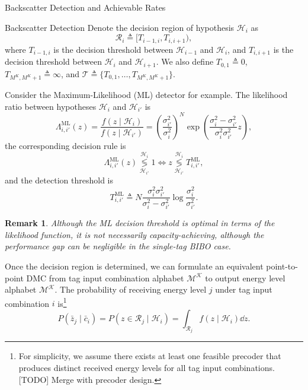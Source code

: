 \documentclass[journal]{IEEEtran}
\newtheorem{remark}{Remark}
\begin{document}
\begin{section}{Backscatter Detection and Achievable Rates}
\begin{subsection}{Backscatter Detection}
			Denote the decision region of hypothesis $\mathcal{H}_i$ as
			\begin{equation}
				\mathcal{R}_i \triangleq [T_{i-1,i}, T_{i,i+1}),
				\label{eq:decision_region}
			\end{equation}
			where $T_{i-1,i}$ is the decision threshold between $\mathcal{H}_{i-1}$ and $\mathcal{H}_i$, and $T_{i,i+1}$ is the decision threshold between $\mathcal{H}_i$ and $\mathcal{H}_{i+1}$. We also define $T_{0,1} \triangleq 0$, $T_{M^K,M^K+1} \triangleq \infty$, and $\mathcal{T} \triangleq \{T_{0,1},\ldots,T_{M^K,M^K+1}\}$.

			Consider the Maximum-Likelihood (ML) detector for example. The likelihood ratio between hypotheses $\mathcal{H}_i$ and $\mathcal{H}_{i'}$ is \cite{Qian2019}
			\begin{equation}
				\Lambda_{i,{i'}}^{\mathrm{ML}}(z) = \frac{f(z \mid \mathcal{H}_i)}{f(z \mid \mathcal{H}_{i'})} = \left( \frac{\sigma_{i'}^2}{\sigma_i^2} \right)^N \exp \left( \frac{\sigma_i^2 - \sigma_{i'}^2}{\sigma_i^2 \sigma_{i'}^2} z \right),
				\label{eq:likelihood_ratio}
			\end{equation}
			the corresponding decision rule is
			\begin{equation}
				\Lambda_{i,{i'}}^{\mathrm{ML}}(z) \underset{\mathcal{H}_{i'}}{\overset{\mathcal{H}_i}{\lessgtr}} 1 \iff z \underset{\mathcal{H}_{i'}}{\overset{\mathcal{H}_i}{\lessgtr}} T_{i,{i'}}^{\mathrm{ML}},
				\label{eq:decision_rule}
			\end{equation}
			and the detection threshold is
			\begin{equation}
				T_{i,{i'}}^{\mathrm{ML}} \triangleq N \frac{\sigma_i^2 \sigma_{i'}^2}{\sigma_i^2 - \sigma_{i'}^2} \log \frac{\sigma_i^2}{\sigma_{i'}^2}.
				\label{eq:detection_threshold}
			\end{equation}

			\begin{remark}
				Although the ML decision threshold is optimal in terms of the likelihood function, it is not necessarily capacity-achieving, although the performance gap can be negligible in the single-tag BIBO case.
			\end{remark}

			Once the decision region is determined, we can formulate an equivalent point-to-point DMC from tag input combination alphabet $\mathcal{M^K}$ to output energy level alphabet $\mathcal{M^K}$. The probability of receiving energy level $j$ under tag input combination $i$ is\footnote{For simplicity, we assume there exists at least one feasible precoder that produces distinct received energy levels for all tag input combinations. [TODO] Merge with precoder design.}
			\begin{equation}
				P(\bar{z}_j \mid \bar{c}_i) = P(z \in \mathcal{R}_j \mid \mathcal{H}_i) = \int_{\mathcal{R}_j} f(z \mid \mathcal{H}_i) \dd z.
				\label{eq:point_to_point_channel}
			\end{equation}


\end{subsection}
\end{section}
\end{document}
